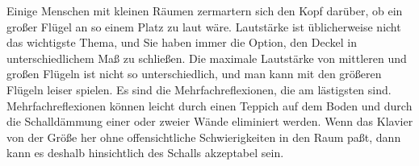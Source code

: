 Einige Menschen mit kleinen Räumen zermartern sich den Kopf darüber, ob ein großer Flügel an so einem Platz zu laut wäre.
Lautstärke ist üblicherweise nicht das wichtigste Thema, und Sie haben immer die Option, den Deckel in unterschiedlichem Maß zu schließen.
Die maximale Lautstärke von mittleren und großen Flügeln ist nicht so unterschiedlich, und man kann mit den größeren Flügeln leiser spielen.
Es sind die Mehrfachreflexionen, die am lästigsten sind.
Mehrfachreflexionen können leicht durch einen Teppich auf dem Boden und durch die Schalldämmung einer oder zweier Wände eliminiert werden.
Wenn das Klavier von der Größe her ohne offensichtliche Schwierigkeiten in den Raum paßt, dann kann es deshalb hinsichtlich des Schalls akzeptabel sein.



